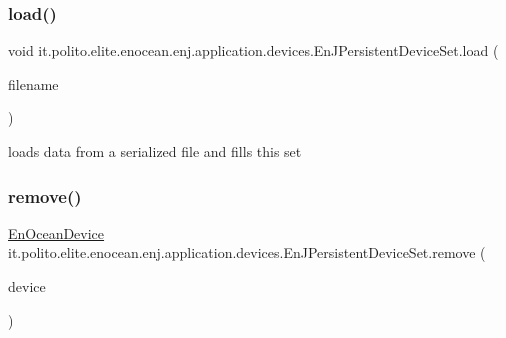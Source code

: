 \subsubsection{\texorpdfstring{load()}{load()}\hspace{0.1cm}{\footnotesize\ttfamily [2/2]}}
{\footnotesize\ttfamily void it.\+polito.\+elite.\+enocean.\+enj.\+application.\+devices.\+En\+J\+Persistent\+Device\+Set.\+load (\begin{DoxyParamCaption}\item[{String}]{filename }\end{DoxyParamCaption})}

loads data from a serialized file and fills this set \hypertarget{classit_1_1polito_1_1elite_1_1enocean_1_1enj_1_1application_1_1devices_1_1_en_j_persistent_device_set_a9f32f2e98193d3045a7ea3d4285dee16}{}\label{classit_1_1polito_1_1elite_1_1enocean_1_1enj_1_1application_1_1devices_1_1_en_j_persistent_device_set_a9f32f2e98193d3045a7ea3d4285dee16} 
\subsubsection{\texorpdfstring{remove()}{remove()}\hspace{0.1cm}{\footnotesize\ttfamily [1/2]}}
{\footnotesize\ttfamily \hyperlink{classit_1_1polito_1_1elite_1_1enocean_1_1enj_1_1model_1_1_en_ocean_device}{En\+Ocean\+Device} it.\+polito.\+elite.\+enocean.\+enj.\+application.\+devices.\+En\+J\+Persistent\+Device\+Set.\+remove (\begin{DoxyParamCaption}\item[{\hyperlink{classit_1_1polito_1_1elite_1_1enocean_1_1enj_1_1model_1_1_en_ocean_device}{En\+Ocean\+Device}}]{device }\end{DoxyParamCaption})}

\hypertarget{classit_1_1polito_1_1elite_1_1enocean_1_1enj_1_1application_1_1devices_1_1_en_j_persistent_device_set_a8064698a9f12b69f7bd648e1e62f37e7}{}\label{classit_1_1polito_1_1elite_1_1enocean_1_1enj_1_1application_1_1devices_1_1_en_j_persistent_device_set_a8064698a9f12b69f7bd648e1e62f37e7} 
